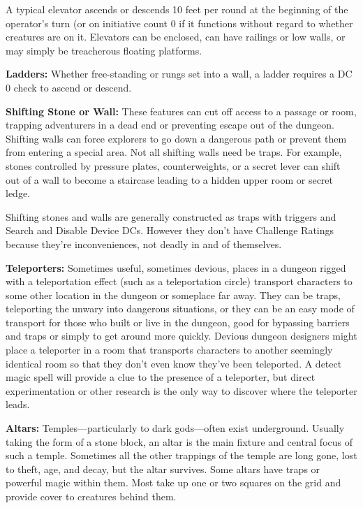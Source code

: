 A typical elevator ascends or descends 10 feet per round at the beginning of the operator's turn (or on initiative count 0 if it functions without regard to whether creatures are on it. Elevators can be enclosed, can have railings or low walls, or may simply be treacherous floating platforms.

\textbf{Ladders:} Whether free-standing or rungs set into a wall, a ladder requires a DC 0  check to ascend or descend.

\textbf{Shifting Stone or Wall:} These features can cut off access to a passage or room, trapping adventurers in a dead end or preventing escape out of the dungeon. Shifting walls can force explorers to go down a dangerous path or prevent them from entering a special area. Not all shifting walls need be traps. For example, stones controlled by pressure plates, counterweights, or a secret lever can shift out of a wall to become a staircase leading to a hidden upper room or secret ledge.

Shifting stones and walls are generally constructed as traps with triggers and Search and Disable Device DCs. However they don't have Challenge Ratings because they're inconveniences, not deadly in and of themselves.

\textbf{Teleporters:} Sometimes useful, sometimes devious, places in a dungeon rigged with a teleportation effect (such as a teleportation circle) transport characters to some other location in the dungeon or someplace far away. They can be traps, teleporting the unwary into dangerous situations, or they can be an easy mode of transport for those who built or live in the dungeon, good for bypassing barriers and traps or simply to get around more quickly. Devious dungeon designers might place a teleporter in a room that transports characters to another seemingly identical room so that they don't even know they've been teleported. A detect magic spell will provide a clue to the presence of a teleporter, but direct experimentation or other research is the only way to discover where the teleporter leads.

\textbf{Altars:} Temples---particularly to dark gods---often exist underground. Usually taking the form of a stone block, an altar is the main fixture and central focus of such a temple. Sometimes all the other trappings of the temple are long gone, lost to theft, age, and decay, but the altar survives. Some altars have traps or powerful magic within them. Most take up one or two squares on the grid and provide cover to creatures behind them.



